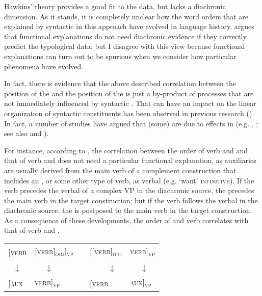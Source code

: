 \documentclass[output=paper]{langsci/langscibook}
\begin{document}
Hawkins’ theory provides a good fit to the data, but lacks a diachronic dimension. As it stands, it is completely unclear how the word orders that are explained by syntactic  in this approach have evolved in language history.  argues that functional explanations do not need diachronic evidence if they correctly predict the typological data; but I disagree with this view because functional explanations can turn out to be spurious when we consider how particular phenomena have evolved.

In fact, there is evidence that the above described correlation between the position of the  and the position of the  is just a by-product of  processes that are not immediately influenced by syntactic . That  can have an impact on the linear organization of syntactic constituents has been observed in previous research (\citealt{Li1974_Chin}). In fact, a number of studies have argued that (some)  are due to  effects in  (e.g. \citealt{Givón1975}, \citealt{Aristar1991,Bybee2010,Collins2012}; see also  and ). 

For instance, according to \citet[111]{Bybee2010}, the correlation between the order of verb and  and that of verb and  does not need a particular functional explanation, as auxiliaries are usually derived from the main verb of a complement construction that includes an , or some other type of verb, as verbal  (e.g. `want' \textsc{infinitive}). If the verb precedes the verbal  of a complex VP in the diachronic source, the  precedes the main verb in the target construction; but if the verb follows the verbal  in the diachronic source, the  is postposed to the main verb in the target construction. As a consequence of these developments, the order of  and verb correlates with that of verb and  .

\ea\label{ex:diessel:18}
\begin{tabular}[t]{@{}llcll@{}}
{[\textsc{verb}} & {\textsc{[verb]\textsubscript{obj}]\textsubscript{vp}}} & \hspace{2cm} & {\textsc{[[verb]\textsubscript{obj}}} & {\textsc{verb]\textsubscript{vp}}} \\
\multicolumn{1}{c}{↓}  & ~~~↓ & & ~~~~~↓ & ~~~↓\\
{\textsc{[aux}}  & {\textsc{verb]\textsubscript{vp}}}                      &  & {\textsc{[verb}}  & {\textsc{aux]\textsubscript{vp}}}\\
\end{tabular}
\z
\end{document}
